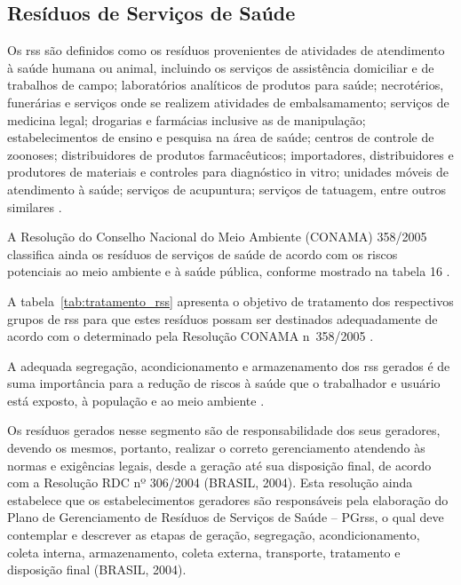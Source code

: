 	
	\subsection{Resíduos de Serviços de Saúde}
	Os \gls{rss} são definidos como os resíduos provenientes de atividades de atendimento à saúde humana ou animal, incluindo os serviços de assistência domiciliar e de trabalhos de campo; laboratórios analíticos de produtos para saúde; necrotérios, funerárias e serviços onde se realizem atividades de embalsamamento; serviços de medicina legal; drogarias e farmácias inclusive as de manipulação; estabelecimentos de ensino e pesquisa na área de saúde; centros de controle de zoonoses; distribuidores de produtos farmacêuticos; importadores, distribuidores e produtores de materiais e controles para diagnóstico in vitro; unidades móveis de atendimento à saúde; serviços de acupuntura; serviços de tatuagem, entre outros similares \cite{conama:362}.
	
	A Resolução do Conselho Nacional do Meio Ambiente (CONAMA) 358/2005 classifica ainda os resíduos de serviços de saúde de acordo com os riscos potenciais ao meio ambiente e à saúde pública, conforme mostrado na tabela 16 \cite{conama:358}.
	
	
	
	A tabela~\ref{tab:tratamento_rss} apresenta o objetivo de tratamento dos respectivos grupos de \gls{rss} para que estes resíduos possam ser destinados adequadamente de acordo com o determinado pela Resolução CONAMA n\textdegree\ 358/2005 \cite{conama:358}. %
	
	
	
	A adequada segregação, acondicionamento e armazenamento dos \gls{rss} gerados é de suma importância para a redução de riscos à saúde que o trabalhador e usuário está exposto, à população e ao meio ambiente \cite{anvisa:2006, conama:358}.
	
	Os resíduos gerados nesse segmento são de responsabilidade dos seus geradores, devendo os mesmos, portanto, realizar o correto gerenciamento atendendo às normas e exigências legais, desde a geração até sua disposição final, de acordo com a Resolução RDC nº 306/2004 (BRASIL, 2004). Esta resolução ainda estabelece que os estabelecimentos geradores são responsáveis pela elaboração do Plano de Gerenciamento de Resíduos de Serviços de Saúde – PG\gls{rss}, o qual deve contemplar e descrever as etapas de geração, segregação, acondicionamento, coleta interna, armazenamento, coleta externa, transporte, tratamento e disposição final (BRASIL, 2004).
	
